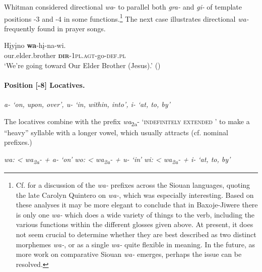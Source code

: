 \documentclass[output=paper]{LSP/langsci}
\begin{document}
			     		  
\largerpage[2]
Whitman considered directional \textit{wa}- to parallel both \textit{gra-} and \textit{gi-} of template positions -3 and -4 in some functions.\footnote{Cf. \citet{Boyle2009} for a discussion of the \textit{wa-} prefixes across the Siouan languages, quoting the late Carolyn Quintero on  \textit{wa-}, which was especially interesting. Based on these     analyses
it may be more elegant to conclude that in Baxoje-Jiwere there is only one \textit{wa-} which does a wide variety of things to the verb, including the various functions within the different glosses given above. At present, it does not seem crucial to determine whether they are best described as two distinct morphemes \textit{wa-}, or as a single \textit{wa-} quite flexible in meaning. In the future, as more work on comparative Siouan \textit{wa-} emerges, perhaps the issue can be resolved.} The next case illustrates directional \textit{wa-} frequently found in prayer songs.	         		

\begin{exe}
\ex \gll H\k{i}y\k{i}no     \textbf{wa}-h\k{i}-na-wi. \\				      	        
our.elder.brother	  \textbf{\textsc{dir}}-1\textsc{pl.agt}-go-\textsc{def.pl} \\		           	  	        
\trans `We're going toward Our Elder Brother (Jesus).' (\citealt{Davidson1997})	
\end{exe}

\noindent
\paragraph*{Position [-8] Locatives.}  	

\ea
\ea   \itshape a-  {\upshape `on, upon, over', 												}
\ex    \itshape u-  {\upshape `in, within, into', 												}
\ex   \itshape i-  {\upshape `at, to, by' \citep[241]{Whitman1947} 			}
\z
\z

 The locatives combine with the prefix \textit{wa}\textsubscript{2a}- `\textsc{indefinitely extended }' to make a ``heavy'' syllable with a longer vowel, which usually attracts  (cf. nominal prefixes.) 	      							

 
\ea
\ea  \itshape  wa:  < wa\textsubscript{2a}- + a-   {\upshape `on'  	 							     	      		}
\ex  \itshape  wo:  < wa\textsubscript{2a}- + u-   {\upshape `in'   									     		}
\ex  \itshape  wi:   < wa\textsubscript{2a}- + i-    {\upshape `at, to, by'}
\z 
\z
\end{document}

